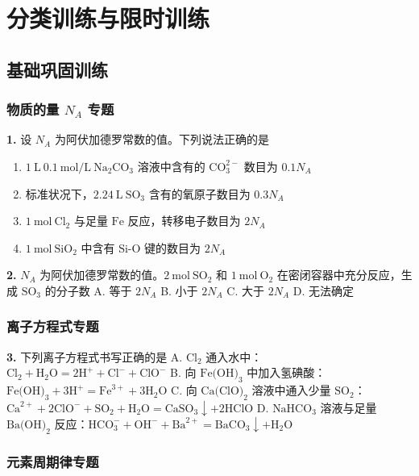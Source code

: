 \section{分类训练与限时训练}

\subsection{基础巩固训练}

\subsubsection{物质的量 $N_A$ 专题}

\textbf{1.} 设 $N_A$ 为阿伏加德罗常数的值。下列说法正确的是
\begin{enumerate}
  \item[A.] $1\ \text{L}\ 0.1\ \text{mol/L}\ \text{Na}_2\text{CO}_3$ 溶液中含有的 $\text{CO}_3^{2-}$ 数目为 $0.1N_A$
  \item[B.] 标准状况下，$2.24\ \text{L}\ \text{SO}_3$ 含有的氧原子数目为 $0.3N_A$
  \item[C.] $1\ \text{mol}\ \text{Cl}_2$ 与足量 $\text{Fe}$ 反应，转移电子数目为 $2N_A$
  \item[D.] $1\ \text{mol}\ \text{SiO}_2$ 中含有 $\text{Si-O}$ 键的数目为 $2N_A$
\end{enumerate}

\textbf{2.} $N_A$ 为阿伏加德罗常数的值。$2\ \text{mol}\ \text{SO}_2$ 和 $1\ \text{mol}\ \text{O}_2$ 在密闭容器中充分反应，生成 $\text{SO}_3$ 的分子数
A. 等于 $2N_A$ \quad B. 小于 $2N_A$ \quad C. 大于 $2N_A$ \quad D. 无法确定

\subsubsection{离子方程式专题}

\textbf{3.} 下列离子方程式书写正确的是
A. $\text{Cl}_2$ 通入水中：$\text{Cl}_2 + \text{H}_2\text{O} = 2\text{H}^+ + \text{Cl}^- + \text{ClO}^-$
B. 向 $\text{Fe(OH)}_3$ 中加入氢碘酸：$\text{Fe(OH)}_3 + 3\text{H}^+ = \text{Fe}^{3+} + 3\text{H}_2\text{O}$
C. 向 $\text{Ca(ClO)}_2$ 溶液中通入少量 $\text{SO}_2$：$\text{Ca}^{2+} + 2\text{ClO}^- + \text{SO}_2 + \text{H}_2\text{O} = \text{CaSO}_3\downarrow + 2\text{HClO}$
D. $\text{NaHCO}_3$ 溶液与足量 $\text{Ba(OH)}_2$ 反应：$\text{HCO}_3^- + \text{OH}^- + \text{Ba}^{2+} = \text{BaCO}_3\downarrow + \text{H}_2\text{O}$

\subsubsection{元素周期律专题}

